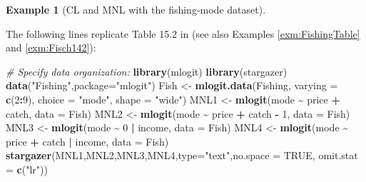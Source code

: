 \documentclass[
  12pt,
]{book}
\newenvironment{Shaded}{\begin{snugshade}}{\end{snugshade}}
\newcommand{\AttributeTok}[1]{\textcolor[rgb]{0.13,0.29,0.53}{#1}}
\newcommand{\CommentTok}[1]{\textcolor[rgb]{0.56,0.35,0.01}{\textit{#1}}}
\newcommand{\ConstantTok}[1]{\textcolor[rgb]{0.56,0.35,0.01}{#1}}
\newcommand{\DecValTok}[1]{\textcolor[rgb]{0.00,0.00,0.81}{#1}}
\newcommand{\FunctionTok}[1]{\textcolor[rgb]{0.13,0.29,0.53}{\textbf{#1}}}
\newcommand{\NormalTok}[1]{#1}
\newcommand{\OtherTok}[1]{\textcolor[rgb]{0.56,0.35,0.01}{#1}}
\newcommand{\SpecialCharTok}[1]{\textcolor[rgb]{0.81,0.36,0.00}{\textbf{#1}}}
\newcommand{\StringTok}[1]{\textcolor[rgb]{0.31,0.60,0.02}{#1}}
\theoremstyle{definition}
\theoremstyle{definition}
\newtheorem{example}{Example}[chapter]
\theoremstyle{definition}
\theoremstyle{definition}
\theoremstyle{remark}
\begin{document}
\begin{example}[CL and MNL with the fishing-mode dataset]
\protect\hypertarget{exm:FishingGeneralLogit}{}\label{exm:FishingGeneralLogit}

The following lines replicate Table 15.2 in \citet{Cameron_Trivedi_2005} (see also Examples \ref{exm:FishingTable} and \ref{exm:Fisch142}):

\begin{Shaded}
\begin{Highlighting}[]
\CommentTok{\# Specify data organization:}
\FunctionTok{library}\NormalTok{(mlogit)}
\FunctionTok{library}\NormalTok{(stargazer)}
\FunctionTok{data}\NormalTok{(}\StringTok{"Fishing"}\NormalTok{,}\AttributeTok{package=}\StringTok{"mlogit"}\NormalTok{)}
\NormalTok{Fish }\OtherTok{\textless{}{-}} \FunctionTok{mlogit.data}\NormalTok{(Fishing,}
                    \AttributeTok{varying =} \FunctionTok{c}\NormalTok{(}\DecValTok{2}\SpecialCharTok{:}\DecValTok{9}\NormalTok{),}
                    \AttributeTok{choice =} \StringTok{"mode"}\NormalTok{,}
                    \AttributeTok{shape =} \StringTok{"wide"}\NormalTok{)}
\NormalTok{MNL1 }\OtherTok{\textless{}{-}} \FunctionTok{mlogit}\NormalTok{(mode }\SpecialCharTok{\textasciitilde{}}\NormalTok{ price }\SpecialCharTok{+}\NormalTok{ catch, }\AttributeTok{data =}\NormalTok{ Fish)}
\NormalTok{MNL2 }\OtherTok{\textless{}{-}} \FunctionTok{mlogit}\NormalTok{(mode }\SpecialCharTok{\textasciitilde{}}\NormalTok{ price }\SpecialCharTok{+}\NormalTok{ catch }\SpecialCharTok{{-}} \DecValTok{1}\NormalTok{, }\AttributeTok{data =}\NormalTok{ Fish)}
\NormalTok{MNL3 }\OtherTok{\textless{}{-}} \FunctionTok{mlogit}\NormalTok{(mode }\SpecialCharTok{\textasciitilde{}} \DecValTok{0} \SpecialCharTok{|}\NormalTok{ income, }\AttributeTok{data =}\NormalTok{ Fish)}
\NormalTok{MNL4 }\OtherTok{\textless{}{-}} \FunctionTok{mlogit}\NormalTok{(mode }\SpecialCharTok{\textasciitilde{}}\NormalTok{ price }\SpecialCharTok{+}\NormalTok{ catch }\SpecialCharTok{|}\NormalTok{ income, }\AttributeTok{data =}\NormalTok{ Fish)}
\FunctionTok{stargazer}\NormalTok{(MNL1,MNL2,MNL3,MNL4,}\AttributeTok{type=}\StringTok{"text"}\NormalTok{,}\AttributeTok{no.space =} \ConstantTok{TRUE}\NormalTok{,}
          \AttributeTok{omit.stat =} \FunctionTok{c}\NormalTok{(}\StringTok{"lr"}\NormalTok{))}
\end{Highlighting}
\end{Shaded}


\end{example}
\end{document}
